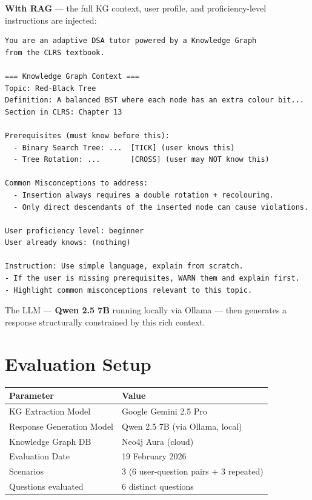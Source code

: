 \documentclass[12pt,a4paper]{article}
\begin{document}
\textbf{With RAG} --- the full KG context, user profile, and
proficiency-level instructions are injected:

\begin{lstlisting}
You are an adaptive DSA tutor powered by a Knowledge Graph
from the CLRS textbook.

=== Knowledge Graph Context ===
Topic: Red-Black Tree
Definition: A balanced BST where each node has an extra colour bit...
Section in CLRS: Chapter 13

Prerequisites (must know before this):
  - Binary Search Tree: ...  [TICK] (user knows this)
  - Tree Rotation: ...       [CROSS] (user may NOT know this)

Common Misconceptions to address:
  - Insertion always requires a double rotation + recolouring.
  - Only direct descendants of the inserted node can cause violations.

User proficiency level: beginner
User already knows: (nothing)

Instruction: Use simple language, explain from scratch.
- If the user is missing prerequisites, WARN them and explain first.
- Highlight common misconceptions relevant to this topic.
\end{lstlisting}

The LLM --- \textbf{Qwen 2.5 7B} running locally via Ollama --- then generates
a response structurally constrained by this rich context.

\section{Evaluation Setup}

\begin{center}
\begin{tabular}{ll}
  \toprule
  \textbf{Parameter} & \textbf{Value} \\
  \midrule
  KG Extraction Model        & Google Gemini 2.5 Pro \\
  Response Generation Model  & Qwen 2.5 7B (via Ollama, local) \\
  Knowledge Graph DB         & Neo4j Aura (cloud) \\
  Evaluation Date            & 19 February 2026 \\
  Scenarios                  & 3 (6 user-question pairs + 3 repeated) \\
  Questions evaluated        & 6 distinct questions \\
  \bottomrule
\end{tabular}
\end{center}
\end{document}
